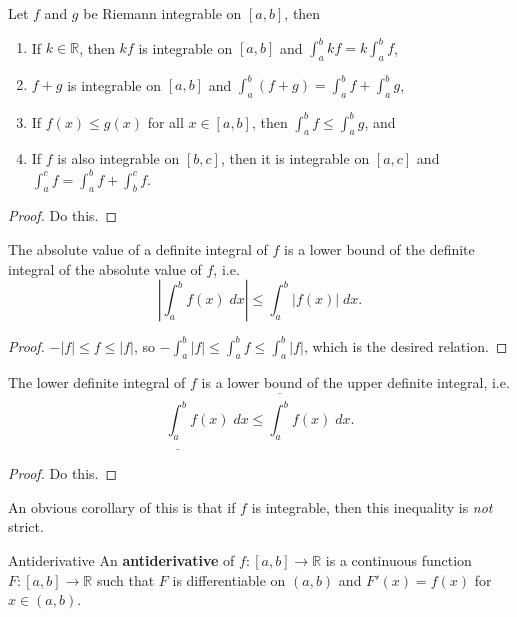 \documentclass[10pt]{report}
\begin{document}
\begin{prop}
	\label{prop:integral-props}
	Let $f$ and $g$ be Riemann integrable on $[a,b]$, then
	\begin{enumerate}
		\item If $k\in\mathbb{R}$, then $kf$ is integrable on $[a,b]$ and $\int_{a}^{b} kf = k \int_{a}^{b} f$,
		\item $f+g$ is integrable on $[a,b]$ and $\int_{a}^{b} (f+g)=\int_{a}^{b} f+\int_{a}^{b} g$,
		\item If $f(x) \leq g(x)$ for all $x \in [a,b]$, then $\int_{a}^{b} f \leq \int_{a}^{b} g$, and
		\item If $f$ is also integrable on $[b,c]$, then it is integrable on $[a,c]$ and $\int_{a}^{c} f = \int_{a}^{b} f + \int_{b}^{c} f$.
	\end{enumerate}
\end{prop}
\begin{proof}
	{\color{red}Do this.}
\end{proof}

\begin{cor}
	The absolute value of a definite integral of $f$ is a lower bound of the definite integral of the absolute value of $f$, i.e.
	\[
		\left| \int_{a}^{b} f(x) \;dx \right| \leq \int_{a}^{b} |f(x)| \;dx.
	\] 
\end{cor}
\begin{proof}
	$-|f| \leq f \leq |f|$, so $-\int_{a}^{b} |f| \leq \int_{a}^{b} f \leq \int_{a}^{b} |f|$, which is the desired relation.
\end{proof}

\begin{prop}
	The lower definite integral of $f$ is a lower bound of the upper definite integral, i.e.
	\[
		\underline{\int_{a}^{b}} f(x) \;dx \leq \overline{\int_{a}^{b} } f(x) \;dx.
	\] 
\end{prop}
\begin{proof}
	{\color{red}Do this.}
\end{proof}

An obvious corollary of this is that if $f$ is integrable, then this inequality is \textit{not} strict.

\begin{defn}{Antiderivative}{}
	An \textbf{antiderivative} of $f:[a,b] \to \mathbb{R}$ is a continuous function $F:[a,b]\to\mathbb{R}$ such that $F$ is differentiable on $(a,b)$ and $F'(x)=f(x)$ for $x\in(a,b)$.
\end{defn}
\end{document}

